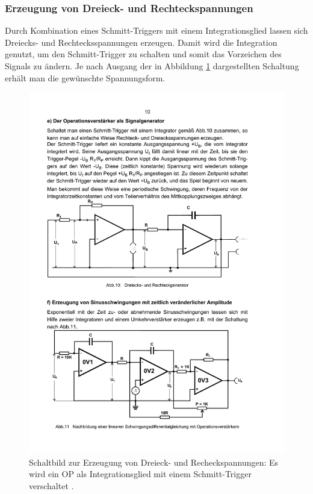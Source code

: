 \subsubsection{Erzeugung von Dreieck- und Rechteckspannungen}
\label{subsubsec:dreieck}
Durch Kombination eines Schmitt-Triggers mit einem Integrationsglied
lassen sich Dreiecks- und Rechtecksspannungen erzeugen. Damit wird die
Integration genutzt, um den Schmitt-Trigger zu schalten und somit das
Vorzeichen des Signals zu ändern. Je nach Ausgang der in Abbildung
\ref{fig:dreieck} dargestellten Schaltung erhält man die gewünschte
Spannungsform.
\begin{figure}
    \centering
    \includegraphics[width=0.9\linewidth]{img/dreieck.pdf}
    \caption{
        Schaltbild zur Erzeugung von Dreieck- und Recheckspannungen:
        Es wird ein OP als Integrationsglied mit einem Schmitt-Trigger
        verschaltet \cite{V51}.
    }
    \label{fig:dreieck}
\end{figure}

